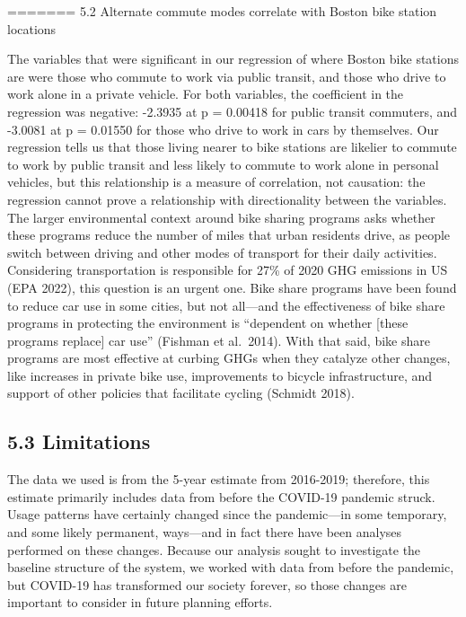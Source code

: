 \documentclass[
  12pt,
]{article}
\begin{document}
======= 5.2 Alternate commute modes correlate with Boston bike station
locations

The variables that were significant in our regression of where Boston
bike stations are were those who commute to work via public transit, and
those who drive to work alone in a private vehicle. For both variables,
the coefficient in the regression was negative: -2.3935 at p = 0.00418
for public transit commuters, and -3.0081 at p = 0.01550 for those who
drive to work in cars by themselves. Our regression tells us that those
living nearer to bike stations are likelier to commute to work by public
transit and less likely to commute to work alone in personal vehicles,
but this relationship is a measure of correlation, not causation: the
regression cannot prove a relationship with directionality between the
variables. The larger environmental context around bike sharing programs
asks whether these programs reduce the number of miles that urban
residents drive, as people switch between driving and other modes of
transport for their daily activities. Considering transportation is
responsible for 27\% of 2020 GHG emissions in US (EPA 2022), this
question is an urgent one. Bike share programs have been found to reduce
car use in some cities, but not all---and the effectiveness of bike
share programs in protecting the environment is ``dependent on whether
{[}these programs replace{]} car use'' (Fishman et al.~2014). With that
said, bike share programs are most effective at curbing GHGs when they
catalyze other changes, like increases in private bike use, improvements
to bicycle infrastructure, and support of other policies that facilitate
cycling (Schmidt 2018).

\hypertarget{limitations}{%
\subsection{5.3 Limitations}\label{limitations}}

The data we used is from the 5-year estimate from 2016-2019; therefore,
this estimate primarily includes data from before the COVID-19 pandemic
struck. Usage patterns have certainly changed since the pandemic---in
some temporary, and some likely permanent, ways---and in fact there have
been analyses performed on these changes. Because our analysis sought to
investigate the baseline structure of the system, we worked with data
from before the pandemic, but COVID-19 has transformed our society
forever, so those changes are important to consider in future planning
efforts.
\end{document}
